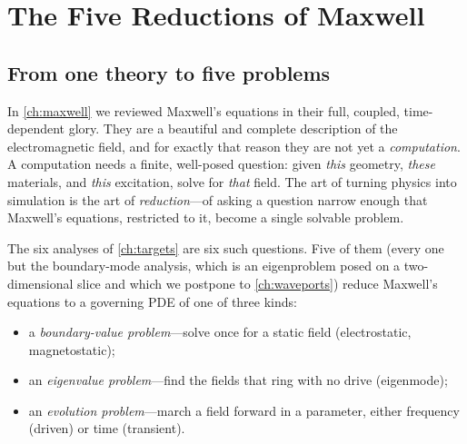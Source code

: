 \chapter{The Five Reductions of Maxwell}
\label{ch:reductions-pde}

\providecommand{\vv}{\mathbf{v}}


\section{From one theory to five problems}

In \cref{ch:maxwell} we reviewed Maxwell's equations in their full, coupled,
time-dependent glory. They are a beautiful and complete description of the
electromagnetic field, and for exactly that reason they are not yet a
\emph{computation}. A computation needs a finite, well-posed question: given
\emph{this} geometry, \emph{these} materials, and \emph{this} excitation, solve
for \emph{that} field. The art of turning physics into simulation is the art of
\emph{reduction}---of asking a question narrow enough that Maxwell's equations,
restricted to it, become a single solvable problem.

The six analyses of \cref{ch:targets} are six such questions. Five of them
(every one but the boundary-mode analysis, which is an eigenproblem posed on a
two-dimensional slice and which we postpone to \cref{ch:waveports}) reduce
Maxwell's equations to a governing PDE of one of three kinds:

\begin{itemize}[nosep]
  \item a \emph{boundary-value problem}---solve once for a static field
  (electrostatic, magnetostatic);
  \item an \emph{eigenvalue problem}---find the fields that ring with no drive
  (eigenmode);
  \item an \emph{evolution problem}---march a field forward in a parameter,
  either frequency (driven) or time (transient).
\end{itemize}


